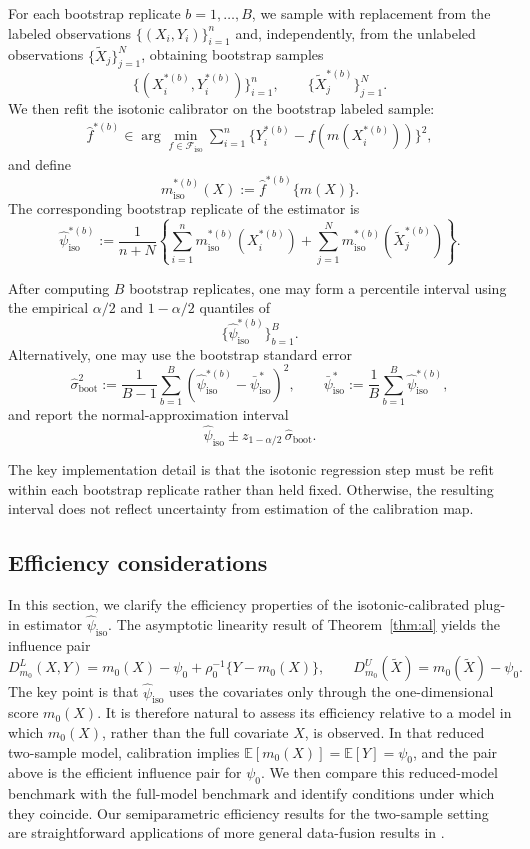 \documentclass{article}
\theoremstyle{plain}
\theoremstyle{definition}
\newcommand{\E}{\mathbb{E}}
\newcommand{\1}{\mathbbm{1}}
\newcommand{\mhat}{m}
\newcommand{\rhozero}{\rho_0}
\begin{document}
For each bootstrap replicate \(b=1,\dots,B\), we sample with replacement from the labeled observations \(\{(X_i,Y_i)\}_{i=1}^n\) and, independently, from the unlabeled observations \(\{\widetilde X_j\}_{j=1}^N\), obtaining bootstrap samples
\[
\{(X_i^{*(b)},Y_i^{*(b)})\}_{i=1}^n,
\qquad
\{\widetilde X_j^{*(b)}\}_{j=1}^N.
\]
We then refit the isotonic calibrator on the bootstrap labeled sample:
\begin{align*}
\hat f^{*(b)}
\in
\arg\min_{f \in \mathcal F_{\mathrm{iso}}}
\sum_{i=1}^n
\bigl\{Y_i^{*(b)} - f(\mhat(X_i^{*(b)}))\bigr\}^2,
\end{align*}
and define
\[
m_{\mathrm{iso}}^{*(b)}(X):=\hat f^{*(b)}\{\mhat(X)\}.
\]
The corresponding bootstrap replicate of the estimator is
\[
\widehat{\psi}_{\mathrm{iso}}^{*(b)}
:=
\frac{1}{n+N}\left\{
\sum_{i=1}^n m_{\mathrm{iso}}^{*(b)}(X_i^{*(b)})
+
\sum_{j=1}^N m_{\mathrm{iso}}^{*(b)}(\widetilde X_j^{*(b)})
\right\}.
\]

After computing \(B\) bootstrap replicates, one may form a percentile interval using the empirical \(\alpha/2\) and \(1-\alpha/2\) quantiles of
\[
\bigl\{\widehat{\psi}_{\mathrm{iso}}^{*(b)}\bigr\}_{b=1}^B.
\]
Alternatively, one may use the bootstrap standard error
\[
\widehat{\sigma}_{\mathrm{boot}}^2
:=
\frac{1}{B-1}\sum_{b=1}^B
\left(\widehat{\psi}_{\mathrm{iso}}^{*(b)}-\bar{\psi}_{\mathrm{iso}}^*\right)^2,
\qquad
\bar{\psi}_{\mathrm{iso}}^*
:=
\frac{1}{B}\sum_{b=1}^B \widehat{\psi}_{\mathrm{iso}}^{*(b)},
\]
and report the normal-approximation interval
\[
\widehat{\psi}_{\mathrm{iso}}
\pm
z_{1-\alpha/2}\,\widehat{\sigma}_{\mathrm{boot}}.
\]

The key implementation detail is that the isotonic regression step must be refit within each bootstrap replicate rather than held fixed. Otherwise, the resulting interval does not reflect uncertainty from estimation of the calibration map.


\subsection{Efficiency considerations}

In this section, we clarify the efficiency properties of the isotonic-calibrated plug-in estimator \(\widehat{\psi}_{\mathrm{iso}}\). The asymptotic linearity result of Theorem~\ref{thm:al} yields the influence pair
\[
D_{m_0}^L(X,Y)=m_0(X)-\psi_0+\rhozero^{-1}\{Y-m_0(X)\},
\qquad
D_{m_0}^U(\widetilde X)=m_0(\widetilde X)-\psi_0.
\]
The key point is that \(\widehat{\psi}_{\mathrm{iso}}\) uses the covariates only through the one-dimensional score \(m_0(X)\). It is therefore natural to assess its efficiency relative to a model in which \(m_0(X)\), rather than the full covariate \(X\), is observed. In that reduced two-sample model, calibration implies \(\E[m_0(X)]=\E[Y]=\psi_0\), and the pair above is the efficient influence pair for \(\psi_0\). We then compare this reduced-model benchmark with the full-model benchmark and identify conditions under which they coincide. Our semiparametric efficiency results for the two-sample setting are straightforward applications of more general data-fusion results in \citet{li2023efficient,graham2024towards}.
\end{document}
